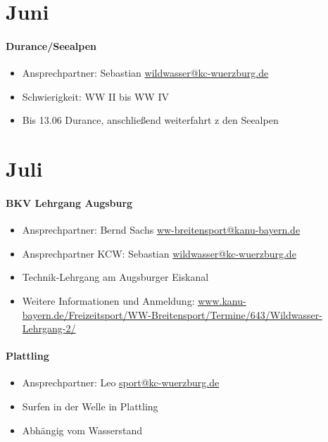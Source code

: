\documentclass[12pt, a4paper]{report}
\begin{document}
\section*{Juni}\paragraph{Durance/Seealpen}
\begin{itemize}
    \item Ansprechpartner: Sebastian \href{mailto:wildwasser@kc-wuerzburg.de}{wildwasser@kc-wuerzburg.de}
    \item Schwierigkeit: WW II bis WW IV
    \item Bis 13.06 Durance, anschließend weiterfahrt z den Seealpen
\end{itemize}

\section*{Juli}\paragraph{BKV Lehrgang Augsburg}
\begin{itemize}
    \item Ansprechpartner: Bernd Sachs \href{mailto:ww-breitensport@kanu-bayern.de}{ww-breitensport@kanu-bayern.de}
    \item Ansprechpartner KCW: Sebastian \href{mailto:wildwasser@kc-wuerzburg.de}{wildwasser@kc-wuerzburg.de}
    \item Technik-Lehrgang am Augsburger Eiskanal
    \item Weitere Informationen und Anmeldung: \url{www.kanu-bayern.de/Freizeitsport/WW-Breitensport/Termine/643/Wildwasser-Lehrgang-2/}
\end{itemize}

\paragraph{Plattling}
\begin{itemize}
    \item Ansprechpartner: Leo \href{mailto:sport@kc-wuerzburg.de}{sport@kc-wuerzburg.de}
    \item Surfen in der Welle in Plattling
    \item Abhängig vom Wasserstand
\end{itemize}
\end{document}
